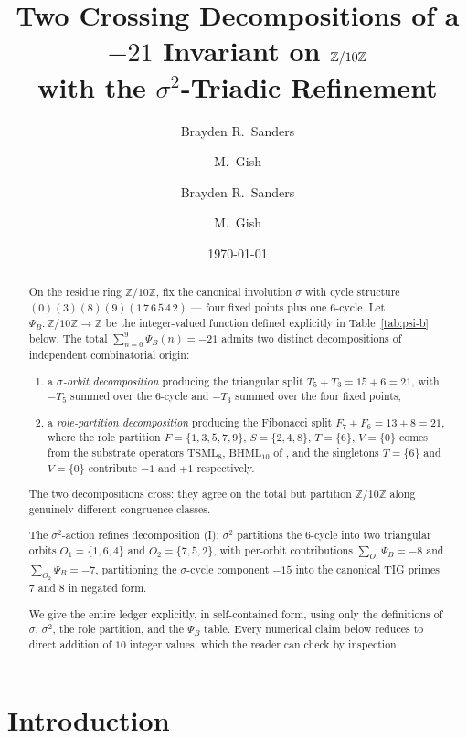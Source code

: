\documentclass[11pt,reqno]{amsart}
\title[$\sigma^{2}$-Triadic Decomposition on $\Z/10\Z$]
{Two Crossing Decompositions of a $-21$ Invariant on $\Z/10\Z$ \\
 with the $\sigma^{2}$-Triadic Refinement}
\author{Brayden R.\ Sanders \and M.\ Gish}
\author{Brayden R.\ Sanders \and M.\ Gish}
\date{\today}
\theoremstyle{plain}
\theoremstyle{definition}
\theoremstyle{remark}
\newcommand{\Z}{\mathbb{Z}}
\newcommand{\TS}{\mathrm{TSML}}
\newcommand{\BH}{\mathrm{BHML}}
\newcommand{\sig}{\sigma}
\begin{document}
\begin{abstract}
On the residue ring $\Z/10\Z$, fix the canonical involution $\sig$ with cycle
structure $(0)(3)(8)(9)(1\,7\,6\,5\,4\,2)$ --- four fixed points plus one
$6$-cycle. Let $\Psi_{B} : \Z/10\Z \to \Z$ be the integer-valued function
defined explicitly in Table~\ref{tab:psi-b} below.
The total $\sum_{n=0}^{9} \Psi_{B}(n) = -21$ admits two distinct
decompositions of independent combinatorial origin:
\begin{enumerate}
\item[(I)] a \emph{$\sig$-orbit decomposition} producing the triangular
split $T_5 + T_3 = 15 + 6 = 21$, with $-T_5$ summed over the $6$-cycle
and $-T_3$ summed over the four fixed points;
\item[(II)] a \emph{role-partition decomposition} producing the Fibonacci
split $F_7 + F_6 = 13 + 8 = 21$, where the role partition
$F = \{1,3,5,7,9\}$, $S = \{2,4,8\}$, $T = \{6\}$, $V = \{0\}$ comes from
the substrate operators $\TS_{8}$, $\BH_{10}$ of \cite{SandersGishFourCore},
and the singletons $T = \{6\}$ and $V = \{0\}$ contribute $-1$ and $+1$
respectively.
\end{enumerate}
The two decompositions cross: they agree on the total but partition
$\Z/10\Z$ along genuinely different congruence classes.

The $\sig^{2}$-action refines decomposition (I): $\sig^{2}$ partitions
the $6$-cycle into two triangular orbits $O_{1} = \{1, 6, 4\}$ and
$O_{2} = \{7, 5, 2\}$, with per-orbit contributions
$\sum_{O_1} \Psi_B = -8$ and $\sum_{O_2} \Psi_B = -7$, partitioning
the $\sig$-cycle component $-15$ into the canonical TIG primes $7$ and
$8$ in negated form.

We give the entire ledger explicitly, in self-contained form, using
only the definitions of $\sig$, $\sig^{2}$, the role partition, and
the $\Psi_B$ table.  Every numerical claim below reduces to direct
addition of $10$ integer values, which the reader can check by
inspection.
\end{abstract}

\maketitle

\tableofcontents

\section{Introduction}
\end{document}
